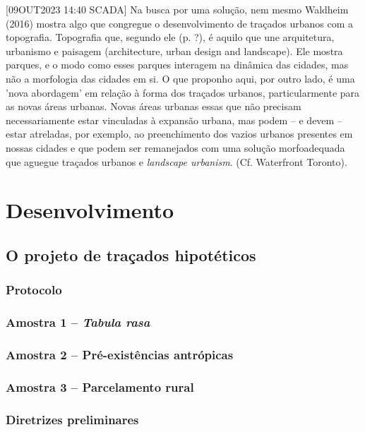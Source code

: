 \documentclass[12pt, a4paper]{book} %
\begin{document}
            

        [09OUT2023 14:40 SCADA] Na busca por uma solução, nem mesmo Waldheim (2016) mostra algo que congregue o desenvolvimento de traçados urbanos com a topografia. Topografia que, segundo ele (p. ?), é aquilo que une arquitetura, urbanismo e paisagem (architecture, urban design and landscape). Ele mostra parques, e o modo como esses parques interagem na dinâmica das cidades, mas não a morfologia das cidades em si.
        O que proponho aqui, por outro lado, é uma 'nova abordagem' em relação à forma dos traçados urbanos, particularmente para as novas áreas urbanas. Novas áreas urbanas essas que não precisam necessariamente estar vinculadas à expansão urbana, mas podem – e devem – estar atreladas, por exemplo, ao preenchimento dos vazios urbanos presentes em nossas cidades e que podem ser remanejados com uma solução morfoadequada que aguegue traçados urbanos e \textit{landscape urbanism}. (Cf. Waterfront Toronto).

    \part[Desenvolvimento]{Desenvolvimento}

        \chapter[Traçados hipotéticos]{O projeto de traçados hipotéticos}

            \section{Protocolo}
            \section{Amostra 1 – \textit{Tabula rasa}}
            \section{Amostra 2 – Pré-existências antrópicas}
            \section{Amostra 3 – Parcelamento rural}
            \section{Diretrizes preliminares}
\end{document}
